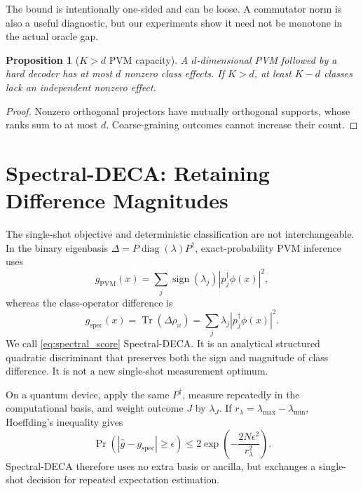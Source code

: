 \documentclass[10pt,twocolumn]{article}
\newtheorem{proposition}[theorem]{Proposition}
\theoremstyle{definition}
\theoremstyle{remark}
\newcommand{\Tr}{\operatorname{Tr}}
\newcommand{\diag}{\operatorname{diag}}
\begin{document}
The bound is intentionally one-sided and can be loose.  A commutator norm is
also a useful diagnostic, but our experiments show it need not be monotone in
the actual oracle gap.

\begin{proposition}[$K>d$ PVM capacity]
\label{prop:capacity}
A $d$-dimensional PVM followed by a hard decoder has at most $d$ nonzero
class effects.  If $K>d$, at least $K-d$ classes lack an independent nonzero
effect.
\end{proposition}
\begin{proof}
Nonzero orthogonal projectors have mutually orthogonal supports, whose ranks
sum to at most $d$.  Coarse-graining outcomes cannot increase their count.
\end{proof}

\section{Spectral-DECA: Retaining Difference Magnitudes}
\label{sec:spectral}

The single-shot objective and deterministic classification are not
interchangeable.  In the binary eigenbasis
$\Delta=P\diag(\lambda)P^\dagger$, exact-probability PVM inference uses
\begin{equation}
g_{\mathrm{PVM}}(x)
=\sum_j\operatorname{sign}(\lambda_j)
|p_j^\dagger\phi(x)|^2,
\end{equation}
whereas the class-operator difference is
\begin{equation}
\boxed{
g_{\mathrm{spec}}(x)
=\Tr(\Delta\rho_x)
=\sum_j\lambda_j|p_j^\dagger\phi(x)|^2.
}
\label{eq:spectral_score}
\end{equation}
We call \cref{eq:spectral_score} Spectral-DECA.  It is an analytical
structured quadratic discriminant that preserves both the sign and magnitude
of class difference.  It is not a new single-shot measurement optimum.

On a quantum device, apply the same $P^\dagger$, measure repeatedly in the
computational basis, and weight outcome $J$ by $\lambda_J$.  If
$r_\lambda=\lambda_{\max}-\lambda_{\min}$, Hoeffding's inequality
\cite{hoeffding1963} gives
\begin{equation}
\Pr\!\left(
|\widehat g-g_{\mathrm{spec}}|\ge\epsilon
\right)
\le
2\exp\left(-\frac{2N\epsilon^2}{r_\lambda^2}\right).
\label{eq:shot_bound}
\end{equation}
Spectral-DECA therefore uses no extra basis or ancilla, but exchanges a
single-shot decision for repeated expectation estimation.
\end{document}
